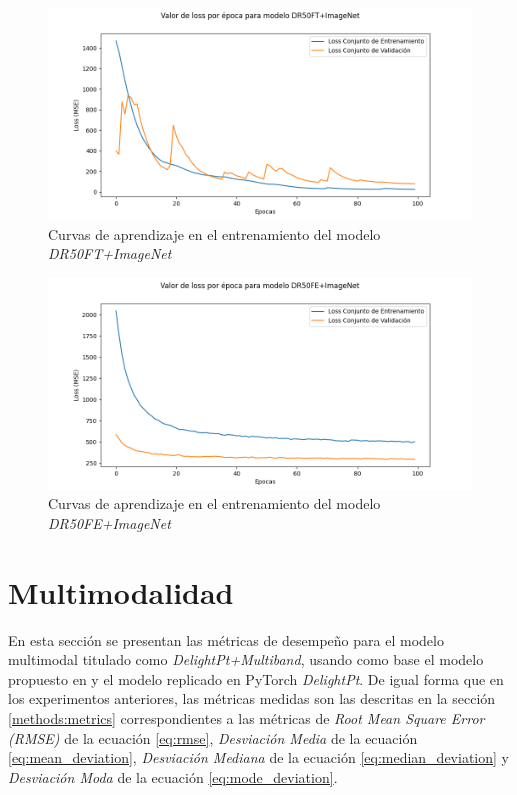 \documentclass[../tesis.tex]{subfiles}
\begin{document}
\begin{figure}[h]
    \centering
    \includegraphics[width=1\linewidth]{images/results/exp1/dr50ft+ImageNet.png}
    \caption{Curvas de aprendizaje en el entrenamiento del modelo \textit{DR50FT+ImageNet}}
    \label{fig:training-curves-dr50ft+ImageNet}
\end{figure}

\begin{figure}[h!]
    \centering
    \includegraphics[width=1\linewidth]{images/results/exp1/dr50fe+ImageNet.png}
    \caption{Curvas de aprendizaje en el entrenamiento del modelo \textit{DR50FE+ImageNet}}
    \label{fig:training-curves-dr50fe+ImageNet}
\end{figure}

\section{Multimodalidad} \label{results:multimodality}
En esta sección se presentan las métricas de desempeño para el modelo multimodal titulado como \textit{DelightPt+Multiband}, usando como base el modelo propuesto en \cite{delight} y el modelo replicado en PyTorch \textit{DelightPt}. De igual forma que en los experimentos anteriores, las métricas medidas son las descritas en la sección \ref{methods:metrics} correspondientes a las métricas de \textit{Root Mean Square Error (RMSE)} de la ecuación \ref{eq:rmse}, \textit{Desviación Media} de la ecuación \ref{eq:mean_deviation}, \textit{Desviación Mediana} de la ecuación \ref{eq:median_deviation} y \textit{Desviación Moda} de la ecuación \ref{eq:mode_deviation}.\par\null\par
\end{document}
